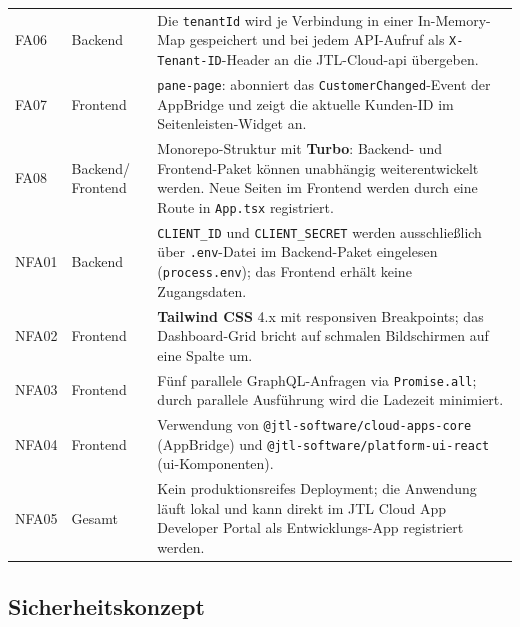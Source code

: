 \documentclass[11pt, a4paper, oneside]{report}
\begin{document}
\begin{longtable}{@{} l l p{9cm} @{}}
  FA06 & Backend & Die \texttt{tenantId} wird je Verbindung in einer In-Memory-Map
                  gespeichert und bei jedem API-Aufruf als \texttt{X-Tenant-ID}-Header
                  an die JTL-Cloud-\gls{api} übergeben. \\[4pt]
  FA07 & Frontend & \texttt{pane-page}: abonniert das \texttt{CustomerChanged}-Event
                   der AppBridge und zeigt die aktuelle Kunden-ID im
                   Seitenleisten-Widget an. \\[4pt]
  FA08 & Backend/ Frontend & Monorepo-Struktur mit \textbf{Turbo}: Backend- und
                            Frontend-Paket können unabhängig weiterentwickelt werden.
                            Neue Seiten im Frontend werden durch eine Route in
                            \texttt{App.tsx} registriert. \\[4pt]
  NFA01 & Backend & \texttt{CLIENT\_ID} und \texttt{CLIENT\_SECRET} werden ausschließlich
                    über \texttt{.env}-Datei im Backend-Paket eingelesen
                    (\texttt{process.env}); das Frontend erhält keine Zugangsdaten. \\[4pt]
  NFA02 & Frontend & \textbf{Tailwind CSS} 4.x mit responsiven Breakpoints; das
                     Dashboard-Grid bricht auf schmalen Bildschirmen auf eine Spalte um. \\[4pt]
  NFA03 & Frontend & Fünf parallele GraphQL-Anfragen via \texttt{Promise.all}; durch
                     parallele Ausführung wird die Ladezeit minimiert. \\[4pt]
  NFA04 & Frontend & Verwendung von \texttt{@jtl-software/cloud-apps-core} (AppBridge)
                    und \texttt{@jtl-software/platform-ui-react} (\gls{ui}-Komponenten). \\[4pt]
  NFA05 & Gesamt & Kein produktionsreifes Deployment; die Anwendung läuft lokal
                  und kann direkt im JTL Cloud App Developer Portal als
                  Entwicklungs-App registriert werden. \\
\end{longtable}

\subsection*{Sicherheitskonzept}
\end{document}
